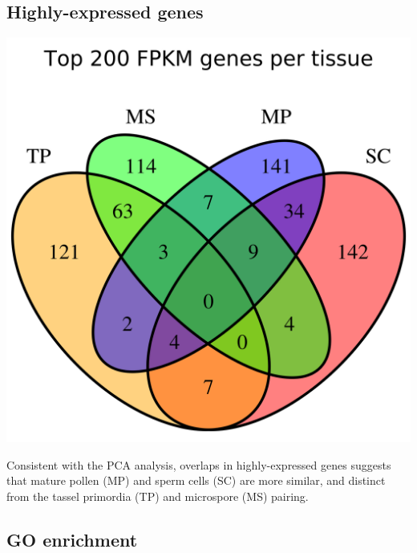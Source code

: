 \documentclass[a0,30pt]{sciposter}
\newlength{\figwidth}
\begin{document}
\begin{multicols}{3}
  \subsection*{Highly-expressed genes}
  
  \begin{center}
    \begin{minipage}[t]{0.5\figwidth}
      \includegraphics[width=0.47\figwidth]{Fowler-top200-Venn.png}
    \end{minipage}
    \begin{minipage}[b]{0.5\figwidth}
    \end{minipage}
  \end{center}
  
  Consistent with the PCA analysis, overlaps in highly-expressed genes suggests that mature pollen (MP) and sperm cells (SC) are more similar,
  and distinct from the tassel primordia (TP) and microspore (MS) pairing.

  \subsection*{GO enrichment}
  

\end{multicols}
\end{document}
